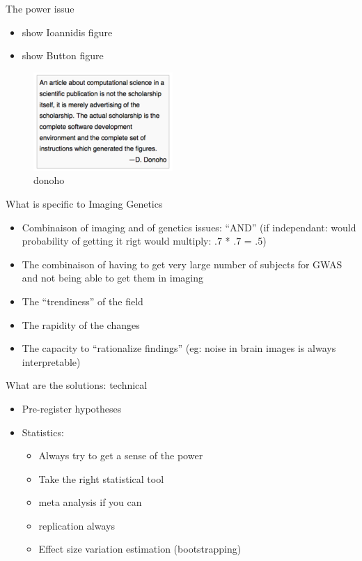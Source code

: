 \begin{frame}{The power issue}

\begin{itemize}
\itemsep1pt\parskip0pt
\item
  show Ioannidis figure
\item
  show Button figure
\end{itemize}

\begin{figure}[htbp]
\centering
\includegraphics{./images/dono.png}
\caption{donoho}
\end{figure}

\end{frame}

\begin{frame}{What is specific to Imaging Genetics}

\begin{itemize}
\itemsep1pt\parskip0pt
\item
  Combinaison of imaging and of genetics issues: ``AND'' (if
  independant: would probability of getting it rigt would multiply: .7 *
  .7 = .5)
\item
  The combinaison of having to get very large number of subjects for
  GWAS and not being able to get them in imaging
\item
  The ``trendiness'' of the field
\item
  The rapidity of the changes
\item
  The capacity to ``rationalize findings'' (eg: noise in brain images is
  always interpretable)
\end{itemize}

\end{frame}

\begin{frame}{What are the solutions: technical}

\begin{itemize}
\itemsep1pt\parskip0pt
\item
  Pre-register hypotheses
\item
  Statistics:

  \begin{itemize}
  \itemsep1pt\parskip0pt
  \item
    Always try to get a sense of the power
  \item
    Take the right statistical tool
  \item
    meta analysis if you can
  \item
    replication always
  \item
    Effect size variation estimation (bootstrapping)
  \end{itemize}
\end{itemize}

\end{frame}


